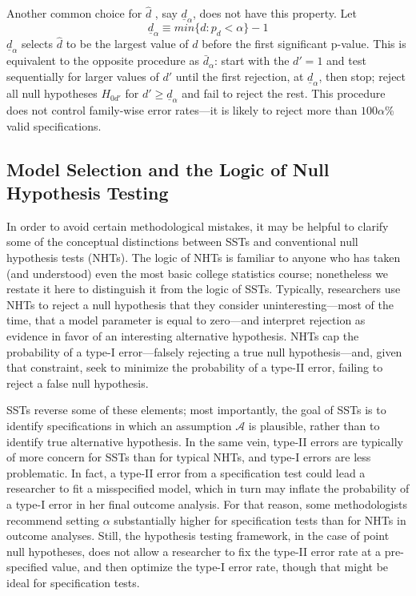\documentclass[sts]{imsart}\usepackage[]{graphicx}\usepackage[]{color}
\newcommand{\dalphaU}{\bar{d}_\alpha}
\newcommand{\dalphaB}{\underline{d}_\alpha}
\begin{document}
Another common choice for $\hat{d}$  \citep[e.g.][]{lutkepohl2005new}, say $\dalphaB$,
does not have this property.
Let
\begin{equation}
\dalphaB\equiv min\{d: p_d<\alpha\}-1
\end{equation}
$\dalphaB$ selects $\hat{d}$ to be the largest value of $d$ before the first
significant p-value.
This is equivalent to the opposite procedure as $\dalphaU$: start with the $d'=1$
and test sequentially for larger values of $d'$ until the first
rejection, at $\dalphaB$, then stop; reject all null
hypotheses $H_{0d'}$ for $d'\ge \dalphaB$ and fail to
reject the rest.
This procedure does not control family-wise error rates---it is likely
to reject more than $100\alpha$\% valid specifications.


\subsection{Model Selection and the Logic of Null Hypothesis Testing}
In order to avoid certain methodological mistakes, it may be helpful to
clarify some of the conceptual distinctions between SSTs and
conventional null hypothesis tests (NHTs).
The logic of NHTs is familiar to anyone who has taken (and understood)
even the most basic college statistics course; nonetheless we restate
it here to distinguish it from the logic of SSTs.
Typically, researchers use NHTs to reject a null hypothesis that they
consider uninteresting---most of the time, that a model parameter is
equal to zero---and interpret rejection as evidence in favor of an
interesting alternative hypothesis.
NHTs cap the probability of a type-I error---falsely rejecting a true
null hypothesis---and, given that constraint, seek to minimize the
probability of a type-II error, failing to reject a false null
hypothesis.

SSTs reverse some of these elements; most importantly, the goal of
SSTs is to identify specifications in which an assumption
$\mathcal{A}$ is plausible, rather than to identify true alternative
hypothesis.
In the same vein, type-II errors are typically of more concern for
SSTs than for typical NHTs, and type-I errors are less problematic.
In fact, a type-II error from a specification test could lead a
researcher to fit a misspecified model, which in turn may inflate the
probability of a type-I error in her final outcome analysis.
For that reason, some methodologists recommend setting $\alpha$
substantially higher for specification tests than for NHTs in outcome
analyses.
Still, the hypothesis testing framework, in the case of point null
hypotheses, does not allow a researcher to
fix the type-II error rate at a pre-specified value, and then optimize
the type-I error rate, though that might be ideal for
specification tests.
\end{document}
